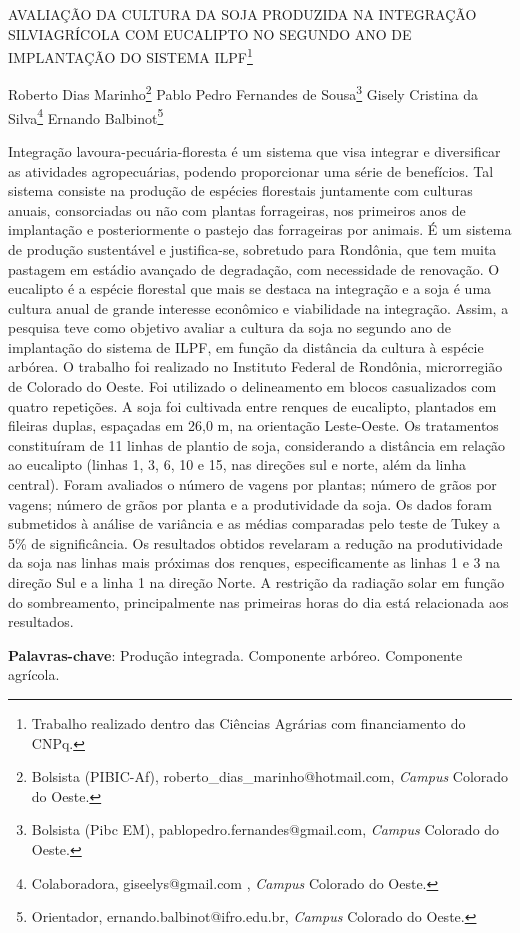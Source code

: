 \documentclass[article,12pt,onesidea,4paper,english,brazil]{abntex2}
\begin{document}
	
	
	\frenchspacing 
	
	\begin{center}
		\LARGE AVALIAÇÃO DA CULTURA DA SOJA PRODUZIDA NA INTEGRAÇÃO
		SILVIAGRÍCOLA COM EUCALIPTO NO SEGUNDO ANO DE IMPLANTAÇÃO DO SISTEMA ILPF\footnote{Trabalho realizado dentro das Ciências Agrárias com financiamento do CNPq.}
		
		\normalsize
		Roberto Dias Marinho\footnote{Bolsista (PIBIC-Af), roberto\_dias\_marinho@hotmail.com, \textit{Campus} Colorado do Oeste.} 
		Pablo Pedro Fernandes de Sousa\footnote{Bolsista (Pibc EM), pablopedro.fernandes@gmail.com, \textit{Campus} Colorado do Oeste.} 
		Gisely Cristina da Silva\footnote{Colaboradora, giseelys@gmail.com , \textit{Campus} Colorado do Oeste.} 
		Ernando Balbinot\footnote{Orientador, ernando.balbinot@ifro.edu.br, \textit{Campus} Colorado do Oeste.} 
	\end{center}
	
	\noindent Integração lavoura-pecuária-floresta é um sistema que visa integrar e diversificar as atividades agropecuárias, podendo proporcionar uma série de benefícios. Tal
	sistema consiste na produção de espécies florestais juntamente com culturas
	anuais, consorciadas ou não com plantas forrageiras, nos primeiros anos de
	implantação e posteriormente o pastejo das forrageiras por animais. É um sistema
	de produção sustentável e justifica-se, sobretudo para Rondônia, que tem muita
	pastagem em estádio avançado de degradação, com necessidade de renovação. O
	eucalipto é a espécie florestal que mais se destaca na integração e a soja é uma
	cultura anual de grande interesse econômico e viabilidade na integração. Assim, a
	pesquisa teve como objetivo avaliar a cultura da soja no segundo ano de
	implantação do sistema de ILPF, em função da distância da cultura à espécie
	arbórea. O trabalho foi realizado no Instituto Federal de Rondônia, microrregião de
	Colorado do Oeste. Foi utilizado o delineamento em blocos casualizados com quatro
	repetições. A soja foi cultivada entre renques de eucalipto, plantados em fileiras
	duplas, espaçadas em 26,0 m, na orientação Leste-Oeste. Os tratamentos
	constituíram de 11 linhas de plantio de soja, considerando a distância em relação ao
	eucalipto (linhas 1, 3, 6, 10 e 15, nas direções sul e norte, além da linha central).
	Foram avaliados o número de vagens por plantas; número de grãos por vagens;
	número de grãos por planta e a produtividade da soja. Os dados foram submetidos à
	análise de variância e as médias comparadas pelo teste de Tukey a 5\% de
	significância. Os resultados obtidos revelaram a redução na produtividade da soja
	nas linhas mais próximas dos renques, especificamente as linhas 1 e 3 na direção
	Sul e a linha 1 na direção Norte. A restrição da radiação solar em função do
	sombreamento, principalmente nas primeiras horas do dia está relacionada aos
	resultados.
	
	\vspace{\onelineskip}
	
	\noindent
	\textbf{Palavras-chave}: Produção integrada. Componente arbóreo. Componente agrícola.
	
\end{document}
